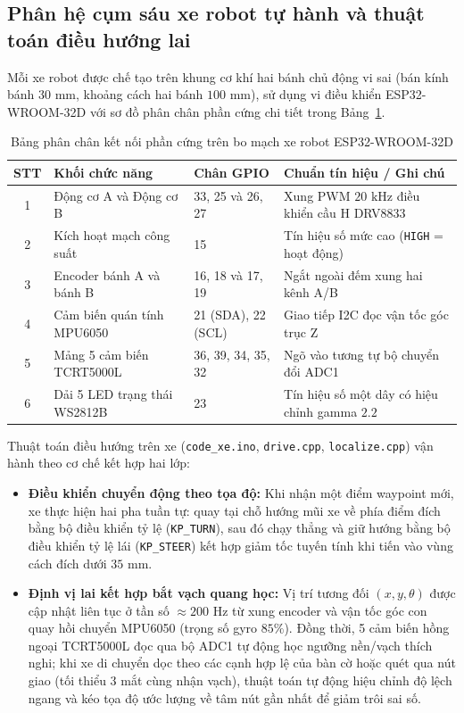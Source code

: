 \documentclass[12pt,a4paper]{report}
\newcommand{\tablefont}{\fontsize{12pt}{15pt}\selectfont}
\begin{document}
	\subsection{Phân hệ cụm sáu xe robot tự hành và thuật toán điều hướng lai}
	Mỗi xe robot được chế tạo trên khung cơ khí hai bánh chủ động vi sai (bán kính bánh $30\text{ mm}$, khoảng cách hai bánh $100\text{ mm}$), sử dụng vi điều khiển ESP32-WROOM-32D với sơ đồ phân chân phần cứng chi tiết trong Bảng~\ref{tab:phan_chan_xe}.
	
	\begin{table}[h!]
		\centering
		\tablefont
		\caption{Bảng phân chân kết nối phần cứng trên bo mạch xe robot ESP32-WROOM-32D}
		\label{tab:phan_chan_xe}
		\renewcommand{\arraystretch}{1.25}
		\begin{tabular}{|c|p{4.2cm}|p{3.0cm}|p{4.6cm}|}
			\hline
			\textbf{STT} & \textbf{Khối chức năng} & \textbf{Chân GPIO} & \textbf{Chuẩn tín hiệu / Ghi chú} \\
			\hline
			1 & Động cơ A và Động cơ B & 33, 25 và 26, 27 & Xung PWM $20\text{ kHz}$ điều khiển cầu H DRV8833 \\
			\hline
			2 & Kích hoạt mạch công suất & 15 & Tín hiệu số mức cao (\texttt{HIGH} = hoạt động) \\
			\hline
			3 & Encoder bánh A và bánh B & 16, 18 và 17, 19 & Ngắt ngoài đếm xung hai kênh A/B \\
			\hline
			4 & Cảm biến quán tính MPU6050 & 21 (SDA), 22 (SCL) & Giao tiếp I2C đọc vận tốc góc trục Z \\
			\hline
			5 & Mảng 5 cảm biến TCRT5000L & 36, 39, 34, 35, 32 & Ngõ vào tương tự bộ chuyển đổi ADC1 \\
			\hline
			6 & Dải 5 LED trạng thái WS2812B & 23 & Tín hiệu số một dây có hiệu chỉnh gamma $2.2$ \\
			\hline
		\end{tabular}
	\end{table}
	
	Thuật toán điều hướng trên xe (\texttt{code\_xe.ino}, \texttt{drive.cpp}, \texttt{localize.cpp}) vận hành theo cơ chế kết hợp hai lớp:
	\begin{itemize}[leftmargin=1.2cm]
		\item \textbf{Điều khiển chuyển động theo tọa độ:} Khi nhận một điểm waypoint mới, xe thực hiện hai pha tuần tự: quay tại chỗ hướng mũi xe về phía điểm đích bằng bộ điều khiển tỷ lệ (\texttt{KP\_TURN}), sau đó chạy thẳng và giữ hướng bằng bộ điều khiển tỷ lệ lái (\texttt{KP\_STEER}) kết hợp giảm tốc tuyến tính khi tiến vào vùng cách đích dưới $35\text{ mm}$.
		\item \textbf{Định vị lai kết hợp bắt vạch quang học:} Vị trí tương đối $(x, y, \theta)$ được cập nhật liên tục ở tần số $\approx 200\text{ Hz}$ từ xung encoder và vận tốc góc con quay hồi chuyển MPU6050 (trọng số gyro $85\%$). Đồng thời, 5 cảm biến hồng ngoại TCRT5000L đọc qua bộ ADC1 tự động học ngưỡng nền/vạch thích nghi; khi xe di chuyển dọc theo các cạnh hợp lệ của bàn cờ hoặc quét qua nút giao (tối thiểu 3 mắt cùng nhận vạch), thuật toán tự động hiệu chỉnh độ lệch ngang và kéo tọa độ ước lượng về tâm nút gần nhất để giảm trôi sai số.
	\end{itemize}
	
\end{document}
